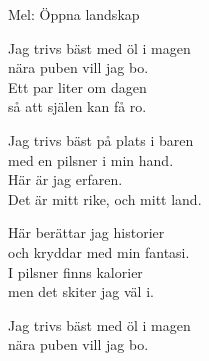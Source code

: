 \begin{SongText}[Trivsel]
    \begin{SongInfo}
        Mel: Öppna landskap
    \end{SongInfo}
    \begin{SongVerse}
        Jag trivs bäst med öl i magen\\%
        nära puben vill jag bo.\\%
        Ett par liter om dagen\\%
        så att själen kan få ro.
    \end{SongVerse}
    \begin{SongVerse}
        Jag trivs bäst på plats i baren\\%
        med en pilsner i min hand.\\%
        Här är jag erfaren.\\%
        Det är mitt rike, och mitt land.
    \end{SongVerse}
    \begin{SongVerse}
        Här berättar jag historier\\%
        och kryddar med min fantasi.\\%
        I pilsner finns kalorier\\%
        men det skiter jag väl i.
    \end{SongVerse}
    \begin{SongVerse}
        Jag trivs bäst med öl i magen\\%
        nära puben vill jag bo.
    \end{SongVerse}
\end{SongText}
